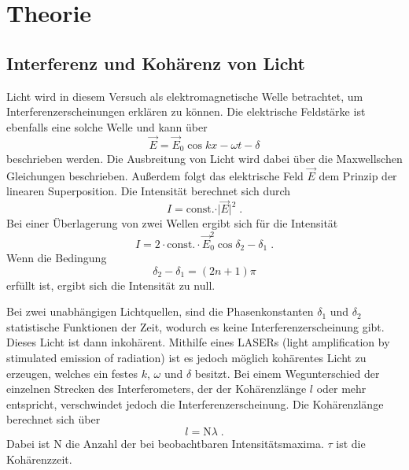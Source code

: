 \section{Theorie}
\label{sec:Theorie}

\subsection{Interferenz und Kohärenz von Licht}
Licht wird in diesem Versuch als elektromagnetische Welle betrachtet, um Interferenzerscheinungen erklären zu können. Die elektrische Feldstärke ist 
ebenfalls eine solche Welle und kann über 
\begin{equation*}
    \vec{E} = \vec{E}_0\cos{kx-\omega t - \delta}
\end{equation*}
beschrieben werden. Die Ausbreitung von Licht wird dabei über die Maxwellschen Gleichungen beschrieben. Außerdem folgt das elektrische Feld 
$\vec{E}$ dem Prinzip der linearen Superposition.
Die Intensität berechnet sich durch 
\begin{equation*}
    I = \text{const.}\cdot \rvert\vec{E}\lvert^2 \; .
\end{equation*}
Bei einer Überlagerung von zwei Wellen ergibt sich für die Intensität 
\begin{equation*}
    I = 2\cdot \text{const.}\cdot \vec{E}_0^2 \cos{\delta_2-\delta_1} \; .
\end{equation*}
Wenn die Bedingung
\begin{equation*}
    \delta_2 -\delta_1 = \left(2n+1\right)\pi 
\end{equation*}
erfüllt ist, ergibt sich die Intensität zu null.

Bei zwei unabhängigen Lichtquellen, sind die Phasenkonstanten $\delta_1$ und $\delta_2$ statistische Funktionen der Zeit, wodurch es keine 
Interferenzerscheinung gibt. Dieses Licht ist dann inkohärent. Mithilfe eines LASERs (light amplification by stimulated emission of radiation)
ist es jedoch möglich kohärentes Licht zu erzeugen, welches ein festes $k$, $\omega$ und $\delta$ besitzt.
Bei einem Wegunterschied der einzelnen Strecken des Interferometers, der der Kohärenzlänge $l$ oder mehr entspricht, verschwindet jedoch die 
Interferenzerscheinung. Die Kohärenzlänge berechnet sich über
\begin{equation*}
    l = \text{N}\lambda \; .
\end{equation*}
Dabei ist N die Anzahl der bei beobachtbaren Intensitätsmaxima. $\tau$ ist die Kohärenzzeit. 

